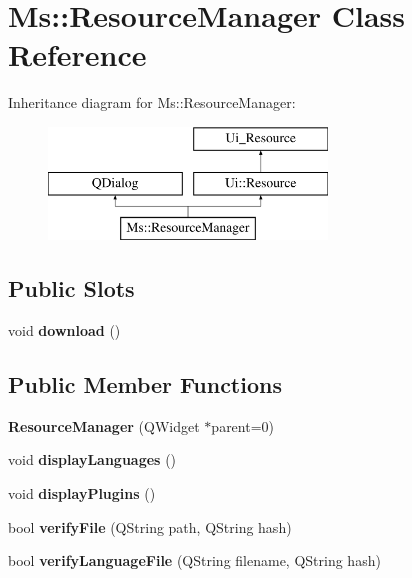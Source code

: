 \hypertarget{class_ms_1_1_resource_manager}{}\section{Ms\+:\+:Resource\+Manager Class Reference}
\label{class_ms_1_1_resource_manager}
Inheritance diagram for Ms\+:\+:Resource\+Manager\+:\begin{figure}[H]
\begin{center}
\leavevmode
\includegraphics[height=3.000000cm]{class_ms_1_1_resource_manager}
\end{center}
\end{figure}
\subsection*{Public Slots}
\begin{DoxyCompactItemize}
\item 
\mbox{\label{class_ms_1_1_resource_manager_a3b40284b8b6781d503652bda85f975b5}} 
void {\bfseries download} ()
\end{DoxyCompactItemize}
\subsection*{Public Member Functions}
\begin{DoxyCompactItemize}
\item 
\mbox{\label{class_ms_1_1_resource_manager_a3167f46a2878db3cb878d44ac8cfeff4}} 
{\bfseries Resource\+Manager} (Q\+Widget $\ast$parent=0)
\item 
\mbox{\label{class_ms_1_1_resource_manager_afd8447adbac6a3e792e7f683a7e45b3e}} 
void {\bfseries display\+Languages} ()
\item 
\mbox{\label{class_ms_1_1_resource_manager_a260ea262d325c1eb801f68100252b262}} 
void {\bfseries display\+Plugins} ()
\item 
\mbox{\label{class_ms_1_1_resource_manager_a83a75c07089e60a9c2c17adbe9e594ec}} 
bool {\bfseries verify\+File} (Q\+String path, Q\+String hash)
\item 
\mbox{\label{class_ms_1_1_resource_manager_a38e5e8c83cd0cb88963778f6678337aa}} 
bool {\bfseries verify\+Language\+File} (Q\+String filename, Q\+String hash)
\end{DoxyCompactItemize}
